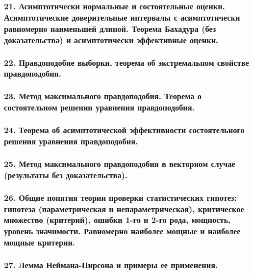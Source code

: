 \documentclass[12pt, russian]{article}
\begin{document}
\newpage
\subsubsection*{21. Асимптотически нормальные и состоятельные оценки. Асимптотические доверительные интервалы с асимптотически равномерно наименьшей длиной. Теорема Бахадура (без доказательства) и асимптотически эффективные оценки.}

\newpage
\subsubsection*{22. Правдоподобие выборки, теорема об экстремальном свойстве правдоподобия.}

\newpage
\subsubsection*{23. Метод максимального правдоподобия. Теорема о состоятельном решении уравнения правдоподобия.}

\newpage
\subsubsection*{24. Теорема об асимптотической эффективности состоятельного решения уравнения правдоподобия.}

\newpage
\subsubsection*{25. Метод максимального правдоподобия в векторном случае (результаты без доказательства).}

\newpage
\subsubsection*{26. Общие понятия теории проверки статистических гипотез: гипотеза (параметрическая и непараметрическая), критическое множество (критерий), ошибки 1-го и 2-го рода, мощность, уровень значимости. Равномерно наиболее мощные и наиболее мощные критерии.}

\newpage
\subsubsection*{27. Лемма Неймана-Пирсона и примеры ее применения.}
\end{document}
